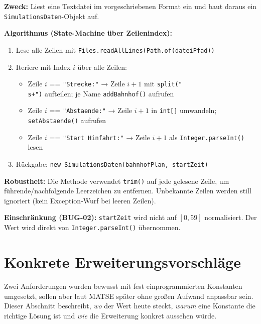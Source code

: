 \documentclass[12pt,a4paper]{article}
\begin{document}
\textbf{Zweck:} Liest eine Textdatei im vorgeschriebenen Format ein und baut
daraus ein \texttt{SimulationsDaten}-Objekt auf.

\textbf{Algorithmus (State-Machine über Zeilenindex):}

\begin{enumerate}
  \item Lese alle Zeilen mit \texttt{Files.readAllLines(Path.of(dateiPfad))}
  \item Iteriere mit Index $i$ über alle Zeilen:
    \begin{itemize}
      \item Zeile $i$ == \texttt{"Strecke:"} → Zeile $i+1$ mit \texttt{split("\\s+")}
            aufteilen; je Name \texttt{addBahnhof()} aufrufen
      \item Zeile $i$ == \texttt{"Abstaende:"} → Zeile $i+1$ in \texttt{int[]}
            umwandeln; \texttt{setAbstaende()} aufrufen
      \item Zeile $i$ == \texttt{"Start Hinfahrt:"} → Zeile $i+1$ als
            \texttt{Integer.parseInt()} lesen
    \end{itemize}
  \item Rückgabe: \texttt{new SimulationsDaten(bahnhofPlan, startZeit)}
\end{enumerate}

\textbf{Robustheit:} Die Methode verwendet \texttt{trim()} auf jede gelesene
Zeile, um führende/nachfolgende Leerzeichen zu entfernen. Unbekannte Zeilen
werden still ignoriert (kein Exception-Wurf bei leeren Zeilen).

\textbf{Einschränkung (BUG-02):} \texttt{startZeit} wird nicht auf $[0,59]$
normalisiert. Der Wert wird direkt von \texttt{Integer.parseInt()} übernommen.

\section{Konkrete Erweiterungsvorschläge}
\label{sec:erweiterungen}

Zwei Anforderungen wurden bewusst mit fest einprogrammierten Konstanten
umgesetzt, sollen aber laut MATSE später ohne großen Aufwand anpassbar sein.
Dieser Abschnitt beschreibt, \emph{wo} der Wert heute steckt,
\emph{warum} eine Konstante die richtige Lösung ist und
\emph{wie} die Erweiterung konkret aussehen würde.

\end{document}
